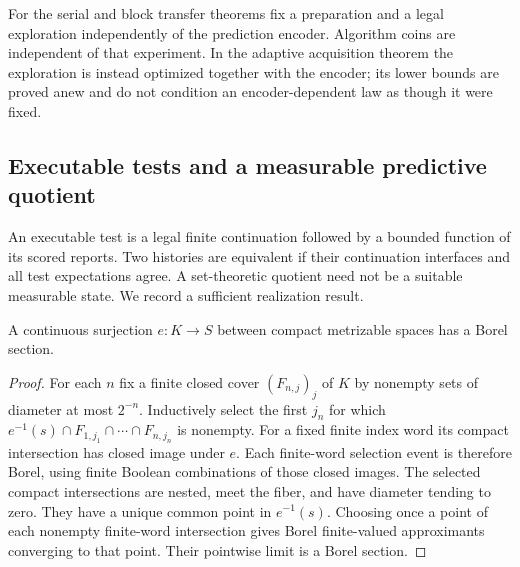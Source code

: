 For the serial and block transfer theorems fix a preparation and a legal exploration independently of the prediction encoder. Algorithm coins are independent of that experiment. In the adaptive acquisition theorem the exploration is instead optimized together with the encoder; its lower bounds are proved anew and do not condition an encoder-dependent law as though it were fixed.

\subsection{Executable tests and a measurable predictive quotient}
An executable test is a legal finite continuation followed by a bounded function of its scored reports. Two histories are equivalent if their continuation interfaces and all test expectations agree. A set-theoretic quotient need not be a suitable measurable state. We record a sufficient realization result.

\begin{lemma}\label{lem:selector}
A continuous surjection $e:K\to S$ between compact metrizable spaces has a Borel section.
\end{lemma}
\begin{proof}
For each $n$ fix a finite closed cover $(F_{n,j})_j$ of $K$ by nonempty sets of diameter at most $2^{-n}$. Inductively select the first $j_n$ for which $e^{-1}(s)\cap F_{1,j_1}\cap\cdots\cap F_{n,j_n}$ is nonempty. For a fixed finite index word its compact intersection has closed image under $e$. Each finite-word selection event is therefore Borel, using finite Boolean combinations of those closed images. The selected compact intersections are nested, meet the fiber, and have diameter tending to zero. They have a unique common point in $e^{-1}(s)$. Choosing once a point of each nonempty finite-word intersection gives Borel finite-valued approximants converging to that point. Their pointwise limit is a Borel section.
\end{proof}

